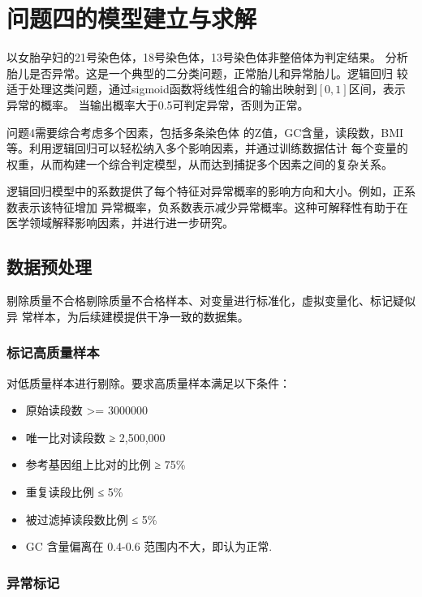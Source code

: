 \documentclass[withoutpreface,notoc]{cumcmthesis}
\begin{document}
	\section{问题四的模型建立与求解}

	以女胎孕妇的21号染色体，18号染色体，13号染色体非整倍体为判定结果。
	分析胎儿是否异常。这是一个典型的二分类问题，正常胎儿和异常胎儿。逻辑回归
	较适于处理这类问题，通过sigmoid函数将线性组合的输出映射到$[0,1]$区间，表示异常的概率。
	当输出概率大于0.5可判定异常，否则为正常。
	
	问题4需要综合考虑多个因素，包括多条染色体
	的Z值，GC含量，读段数，BMI等。利用逻辑回归可以轻松纳入多个影响因素，并通过训练数据估计
	每个变量的权重，从而构建一个综合判定模型，从而达到捕捉多个因素之间的复杂关系。

	逻辑回归模型中的系数提供了每个特征对异常概率的影响方向和大小。例如，正系数表示该特征增加
	异常概率，负系数表示减少异常概率。这种可解释性有助于在医学领域解释影响因素，并进行进一步研究。











	\subsection{数据预处理}
	剔除质量不合格剔除质量不合格样本、对变量进行标准化，虚拟变量化、标记疑似异
	常样本，为后续建模提供干净一致的数据集。

	\subsubsection{标记高质量样本}

	对低质量样本进行剔除。要求高质量样本满足以下条件：
	\begin{itemize}
		\item 原始读段数 >= 3000000
		\item 唯一比对读段数 ≥ 2,500,000
		\item 参考基因组上比对的比例 ≥ 75\%
		\item 重复读段比例 ≤ 5\%
		\item 被过滤掉读段数比例 ≤ 5\%
		\item GC 含量偏离在 0.4-0.6 范围内不大，即认为正常.
	\end{itemize}

	\subsubsection{异常标记}
\end{document}
